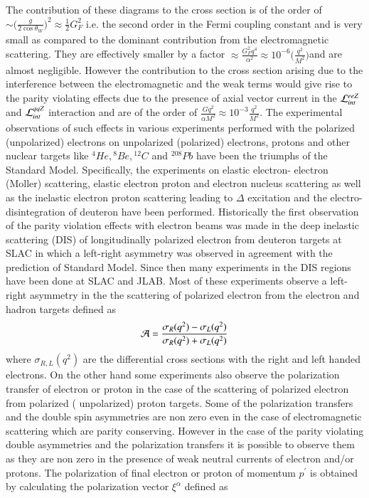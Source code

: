   The contribution of these diagrams to the  cross section is of the order of $\sim \big(\frac{g}{2\cos\theta_W}\big)^2 \approx \frac{1}{2}G_F^2$ i.e. the second order in the  Fermi coupling constant and is very small as compared to the dominant contribution from the electromagnetic scattering. They are effectively smaller by a factor $\approx \frac{G_F^2q^4}{\alpha^2}\approx 10^{-6}\big(\frac{q^2}{M^2}\big)$and are almost negligible. However the contribution to the cross section arising due to the interference between the electromagnetic and the weak terms would give rise to the parity violating effects due to the presence of axial vector current in the ${\cal L}_{int}^{eeZ}$ and ${\cal L}_{int}^{qqZ}$ interaction and are of the order of $\frac{Gq^2}{\alpha M^2}\approx 10^{-3} \frac{q^2}{M^2}$. The experimental observations of such effects in various experiments performed with the polarized (unpolarized) electrons on unpolarized (polarized) electrons, protons and other nuclear targets like ${}^4{He}, {}^8{Be}, {}^{12}{C}$ and ${}^{208}{Pb}$ have been the triumphs of the Standard Model. Specifically, the experiments on elastic electron- electron (Moller) scattering, elastic electron proton and electron nucleus scattering as well as the inelastic electron proton scattering leading to $\Delta$ excitation and the electro-disintegration of deuteron have been performed. Historically the first observation of the parity violation effects with electron beams was made in the deep inelastic scattering (DIS) of longitudinally polarized electron from deuteron targets at SLAC in which a left-right asymmetry was observed  in agreement with the prediction of Standard Model. Since then many experiments in the DIS regions  have been done at SLAC and JLAB. Most of these experiments observe a left-right asymmetry in the the scattering of polarized electron  from the electron and hadron targets defined as
\begin{equation}
{\cal A}= \frac{\sigma_R(q^2)-\sigma_L(q^2)}{\sigma_R(q^2)+\sigma_L(q^2)}  \label{chap9-eq13}
\end{equation}
where $\sigma_{R,L}(q^2)$ are the differential cross sections with the right and left handed electrons. On the other hand some experiments also observe the polarization transfer of electron or proton in the case of the scattering of polarized electron from polarized ( unpolarized) proton targets. Some of the polarization transfers and the double spin asymmetries are non zero even in the case of electromagnetic scattering which are parity conserving. However in the case of the parity violating double asymmetries and the polarization transfers it is possible to observe them as they are non zero in the presence of weak neutral currents of electron and/or protons. The polarization of final electron or proton of momentum $p^\prime$ is obtained by calculating the polarization vector $\xi^{\alpha}$ defined as 
